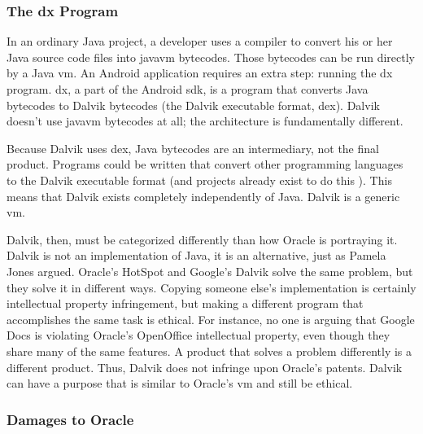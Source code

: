\documentclass[11pt]{article}
\begin{document}
\begin{multicols}{2}
\subsubsection{The dx Program} %
\label{ssub:dex}

In an ordinary Java project, a developer uses a compiler to convert his or her
Java source code files into \gls{javavm} \glspl{bytecode}.  Those
\glspl{bytecode} can be run directly by a Java \gls{vm}.  An Android application
requires an extra step: running the dx program.  dx, a part of the Android
\gls{sdk}, is a program that converts Java \glspl{bytecode} to Dalvik
\glspl{bytecode} (the Dalvik executable format, dex).  Dalvik doesn't use
\gls{javavm} \glspl{bytecode} at all; the architecture is fundamentally
different. \cite{javavm-bytecode} \cite{dalvik-bytecode} \cite{dalvik-vm-arch}

Because Dalvik uses dex, Java \glspl{bytecode} are an intermediary, not the
final product.  Programs could be written that convert other programming
languages to the Dalvik executable format (and projects already exist to do this
\cite{ruboto}).  This means that Dalvik exists completely independently of Java.
Dalvik is a generic \gls{vm}.

Dalvik, then, must be categorized differently than how Oracle is portraying it.
Dalvik is not an implementation of Java, it is an alternative, just as Pamela
Jones argued. \cite{groklaw}  Oracle's HotSpot and Google's Dalvik solve the
same problem, but they solve it in different ways.  Copying someone else's
implementation is certainly intellectual property infringement, but making a
different program that accomplishes the same task is ethical.  For instance, no
one is arguing that Google Docs is violating Oracle's OpenOffice intellectual
property, even though they share many of the same features.  A product that
solves a problem differently is a different product.  Thus, Dalvik does not
infringe upon Oracle's patents.  Dalvik can have a purpose that is similar to
Oracle's \gls{vm} and still be ethical.


\subsubsection{Damages to Oracle} %
\label{ssub:oracle-damage}


\end{multicols}
\end{document}

